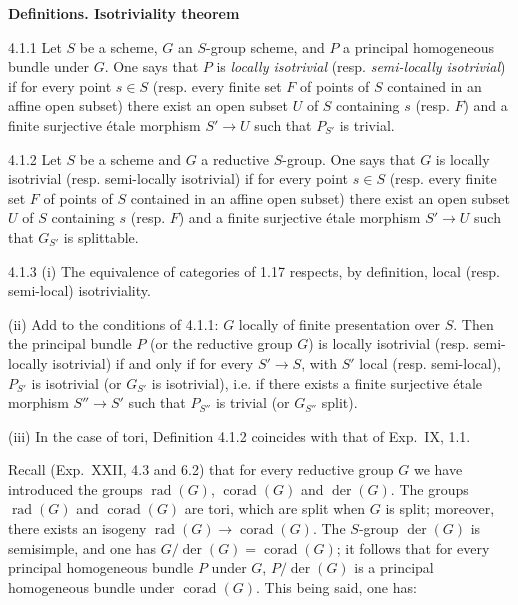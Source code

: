 \label{XXIV.4.1}\textbf{Definitions. Isotriviality theorem}
\begin{definition}{4.1.1}\label{XXIV.4.1.1}
Let $S$ be a scheme, $G$ an $S$-group scheme, and $P$ a principal homogeneous bundle under $G$. One says that $P$ is \emph{locally isotrivial} (resp. \emph{semi-locally isotrivial}) if for every point $s\in S$ (resp. every finite set $F$ of points of $S$ contained in an affine open subset) there exist an open subset $U$ of $S$ containing $s$ (resp. $F$) and a finite surjective étale morphism $S'\to U$ such that $P_{S'}$ is trivial.
\end{definition}
\begin{definition}{4.1.2}\label{XXIV.4.1.2}
Let $S$ be a scheme and $G$ a reductive $S$-group. One says that $G$ is locally isotrivial (resp. semi-locally isotrivial) if for every point $s\in S$ (resp. every finite set $F$ of points of $S$ contained in an affine open subset) there exist an open subset $U$ of $S$ containing $s$ (resp. $F$) and a finite surjective étale morphism $S'\to U$ such that $G_{S'}$ is splittable.
\end{definition}
\begin{remark}{4.1.3}\label{XXIV.4.1.3}
(i) The equivalence of categories of 1.17 respects, by definition, local (resp. semi-local) isotriviality.

(ii) Add to the conditions of 4.1.1: $G$ locally of finite presentation over $S$. Then the principal bundle $P$ (or the reductive group $G$) is locally isotrivial (resp. semi-locally isotrivial) if and only if for every $S'\to S$, with $S'$ local (resp. semi-local), $P_{S'}$ is isotrivial (or $G_{S'}$ is isotrivial), i.e. if there exists a finite surjective étale morphism $S''\to S'$ such that $P_{S''}$ is trivial (or $G_{S''}$ split).

(iii) In the case of tori, Definition 4.1.2 coincides with that of Exp.~IX, 1.1.
\end{remark}
\label{XXIV.4.1.4}
Recall (Exp.~XXII, 4.3 and 6.2) that for every reductive group $G$ we have introduced the groups $\operatorname{rad}(G)$, $\operatorname{corad}(G)$ and $\operatorname{der}(G)$. The groups $\operatorname{rad}(G)$ and $\operatorname{corad}(G)$ are tori, which are split when $G$ is split; moreover, there exists an isogeny $\operatorname{rad}(G)\to\operatorname{corad}(G)$. The $S$-group $\operatorname{der}(G)$ is semisimple, and one has $G/\operatorname{der}(G)=\operatorname{corad}(G)$; it follows that for every principal homogeneous bundle $P$ under $G$, $P/\operatorname{der}(G)$ is a principal homogeneous bundle under $\operatorname{corad}(G)$. This being said, one has:
